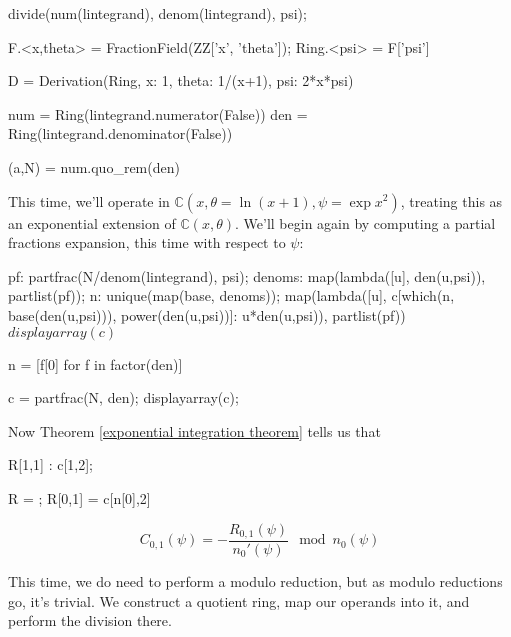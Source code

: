 \begin{maximacode}
divide(num(lintegrand), denom(lintegrand), psi);
\end{maximacode}

\begin{sageblock}
F.<x,theta> = FractionField(ZZ['x', 'theta']);
Ring.<psi> = F['psi']

D = Derivation(Ring, {x: 1, theta: 1/(x+1), psi: 2*x*psi})

num = Ring(lintegrand.numerator(False))
den = Ring(lintegrand.denominator(False))

(a,N) = num.quo_rem(den)
\end{sageblock}

This time, we'll operate in ${\mathbb C}(x,\theta = \ln (x+1),\psi = \exp x^2)$, treating
this as an exponential extension of ${\mathbb C}(x,\theta)$.  We'll begin again by
computing a partial fractions expansion, this time with respect to $\psi$:

\begin{maximacode}
pf: partfrac(N/denom(lintegrand), psi);
denoms: map(lambda([u], den(u,psi)),
            partlist(pf));
n: unique(map(base, denoms));
map(lambda([u],
       c[which(n, base(den(u,psi))),
         power(den(u,psi))]: u*den(u,psi)),
    partlist(pf))$
displayarray(c)$
\end{maximacode}

\begin{sageblock}
n = [f[0] for f in factor(den)]

c = partfrac(N, den);
displayarray(c);
\end{sageblock}

Now Theorem \ref{exponential integration theorem} tells us that

\begin{maximacode}
R[1,1] : c[1,2];
\end{maximacode}

\begin{sageblock}
R = {};
R[0,1] = c[n[0],2]
\end{sageblock}

$$C_{0,1}(\psi) = - \frac{R_{0,1}(\psi)}{n_0'(\psi)} \mod n_0(\psi)$$

This time, we do need to perform a modulo reduction, but as modulo reductions go, it's
trivial.  We construct a quotient ring, map our operands into it, and perform
the division there.


